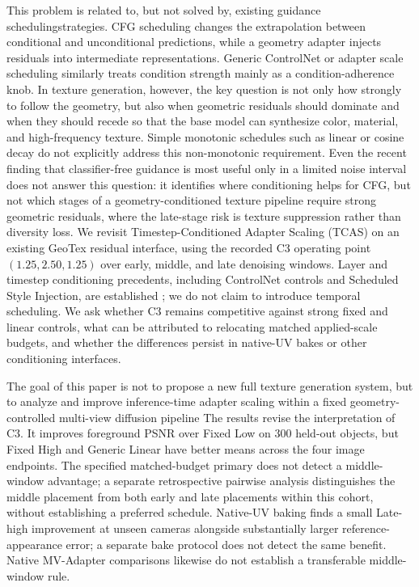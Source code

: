 \documentclass[times,twocolumn,final]{elsarticle}
\providecommand{\DIFadd}[1]{{\protect\color{blue} \sf #1}} %
\providecommand{\DIFdel}[1]{{\protect\color{red} \scriptsize #1}} %
\providecommand{\DIFaddbegin}{} %
\providecommand{\DIFaddend}{} %
\providecommand{\DIFdelbegin}{} %
\providecommand{\DIFdelend}{} %
\begin{document}
\DIFdel{This problem is related to, but not solved by, existing guidance schedulingstrategies. CFG scheduling changes the extrapolation between conditional and unconditional predictions, while a geometry adapter injects residuals into intermediate representations. Generic ControlNet or adapter scale scheduling similarly treats condition strength mainly as a condition-adherence knob. In texture generation, however, the key question is not only how strongly to follow the geometry, but also when geometric residuals should dominate and when they should recede so that the base model can synthesize color, material, and high-frequency texture. Simple monotonic schedules such as linear or cosine decay do not explicitly address this non-monotonic requirement. Even the recent finding that classifier-free guidance is most useful only in a limited noise interval \cite{kynkanniemi2024limited} does not answer this question: it identifies where conditioning helps for CFG, but not which stages of a geometry-conditioned texture pipeline require strong geometric residuals, where the late-stage risk is texture suppression rather than diversity loss. }\DIFdelend \DIFaddbegin \DIFadd{We revisit Timestep-Conditioned Adapter Scaling (TCAS) on an existing GeoTex residual interface, using the recorded C3 operating point $(1.25,2.50,1.25)$ over early, middle, and late denoising windows. Layer and timestep conditioning precedents, including ControlNet controls and Scheduled Style Injection, are established \cite{controlnet2023layercontrol,diffusers2023controlnet,kulkarni2026ssi}; we do not claim to introduce temporal scheduling. We ask whether C3 remains competitive against strong fixed and linear controls, what can be attributed to relocating matched applied-scale budgets, and whether the differences persist in native-UV bakes or other conditioning interfaces.
}\DIFaddend

\DIFdelbegin \DIFdel{The goal of this paper is not to propose a new full texture generation system, but to analyze and improve inference-time adapter scaling within a fixed geometry-controlled multi-view diffusion pipeline}\DIFdelend \DIFaddbegin \DIFadd{The results revise the interpretation of C3. It improves foreground PSNR over Fixed Low on 300 held-out objects, but Fixed High and Generic Linear have better means across the four image endpoints. The specified matched-budget primary does not detect a middle-window advantage; a separate retrospective pairwise analysis distinguishes the middle placement from both early and late placements within this cohort, without establishing a preferred schedule. Native-UV baking finds a small Late-high improvement at unseen cameras alongside substantially larger reference-appearance error; a separate bake protocol does not detect the same benefit. Native MV-Adapter comparisons likewise do not establish a transferable middle-window rule}\DIFaddend .
\end{document}
